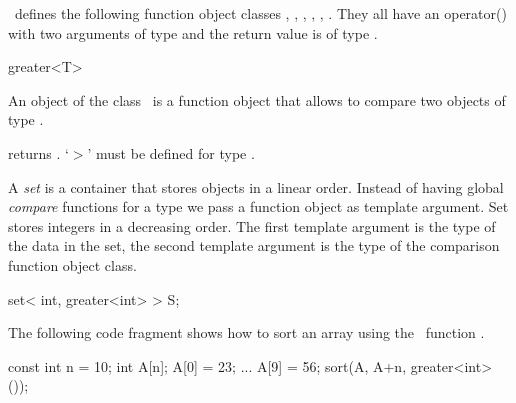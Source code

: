 \ccHtmlLinksOff
{}
\ccHtmlLinksOn

\stl\  defines the following function object classes ,
, , ,
, . They all have an
operator() with two arguments of type  and the return value
is of type .

\begin{ccClassTemplate}{greater<T>}

\ccDefinition
An object of the class \ccClassName\ is a function object that allows
to compare two objects of type . 


\ccOperations

{returns .
\ccPrecond `$>$' must be defined for type .}
\end{ccClassTemplate} 


\ccExample

A {\em set} is a container that stores objects in a linear
order. Instead of having global {\em compare} functions for a type we
pass a function object as template argument. Set  stores
integers in a decreasing order. The first template argument is the
type of the data in the set, the second template argument is the type
of the comparison function object class.


\begin{cprog}
{
    set< int, greater<int> > S;
}
\end{cprog}


The following code fragment shows how to sort an array using the
\stl\ function .

\begin{cprog}
{
    const int n = 10;
    int A[n];
    A[0] = 23;
    ...
    A[9] = 56;
    sort(A, A+n, greater<int>());
}
\end{cprog} 
